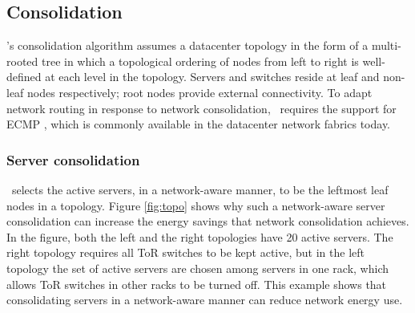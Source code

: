 


%

\subsection{Consolidation}
\label{sec:consolidation}
\shrink's consolidation algorithm assumes a datacenter topology in the form of a multi-rooted tree in which a topological ordering of nodes from left to right is well-defined at each level in the topology.  Servers and switches reside at leaf and non-leaf nodes respectively; root nodes provide external connectivity. To adapt network routing in response to network consolidation, \shrink\ requires the support for ECMP \cite{hopps2000analysis}, which is commonly available in the datacenter network fabrics today. 


\subsubsection{Server consolidation}
\label{sec:serverconsolidation}




\shrink\ selects the active servers, in a network-aware manner, to be the leftmost leaf nodes in a topology. Figure \ref{fig:topo} shows why such a network-aware server consolidation can increase the energy savings that network consolidation achieves. In the figure, both the left and the right topologies  have 20 active servers.  The right topology requires all ToR switches to be kept active, but in the left topology the set of active servers are chosen among servers in one rack, which allows ToR switches in other racks to be turned off.  This example shows that consolidating servers in a network-aware manner can reduce network energy use.

